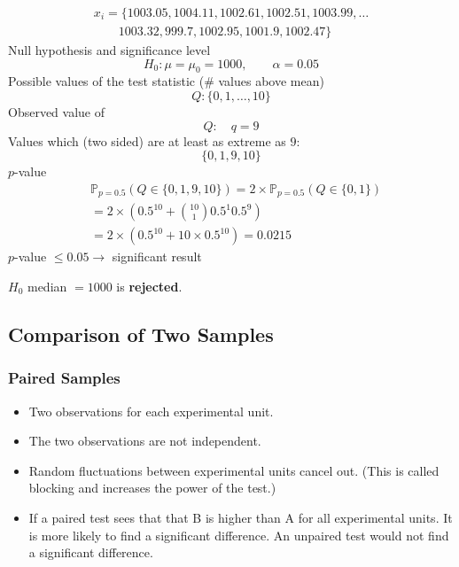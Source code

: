 \begin{examplesection}
    \noindent\begin{gather*}
        x_i = \{1003.05, 1004.11, 1002.61, 1002.51, 1003.99, \ldots \\
        \qquad 1003.32, 999.7, 1002.95, 1001.9, 1002.47\}
    \end{gather*}
    Null hypothesis and significance level
    \begin{equation*}
        H_0: \mu=\mu_0=1000, \qquad \alpha=0.05
    \end{equation*}
    Possible values of the test statistic ($\#$ values above mean)
    \begin{equation*}
        Q: \{0,1,\ldots,10\}
    \end{equation*}
    \newpar{}
    Observed value of
    \begin{equation*}
        Q: \quad q=9
    \end{equation*}
    \newpar{}
    Values which (two sided) are at least as extreme as $9$:
    \begin{equation*}
        \{0,1,9,10\}
    \end{equation*}
    \newpar{}
    $p$-value
    \begin{align*}
         & \mathbb{P}_{p=0.5}(Q\in\{0,1,9,10\})=2\times\mathbb{P}_{p=0.5}(Q\in\{0,1\}) \\
         & = 2\times\left(0.5^{10} + {10 \choose 1} 0.5^1 0.5^9\right)                 \\
         & = 2\times\left(0.5^{10}+ 10\times 0.5^{10}\right)= 0.0215
    \end{align*}
    $p$-value $\leq 0.05 \rightarrow$ significant result
    
    $H_0$ median $= 1000$ is \textbf{rejected}.
\end{examplesection}

\subsection{Comparison of Two Samples}


\subsubsection{Paired Samples}

\begin{itemize}
    \item Two observations for each experimental unit.
    \item The two observations are not independent.
    \item Random fluctuations between experimental units cancel out. (This is called blocking and increases the power of the test.)
    \item If a paired test sees that that B is higher than A for all experimental units. It is more likely to find a significant difference. An unpaired test would not find a significant difference.
\end{itemize}

